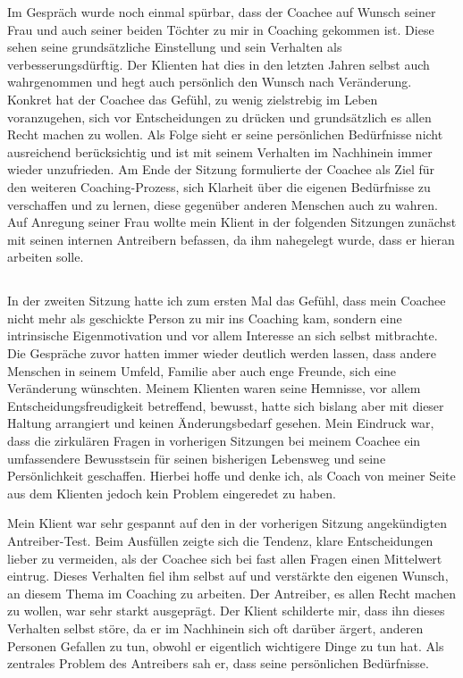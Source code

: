 \documentclass[11pt,a4paper]{article}
\begin{document}
Im Gespräch wurde noch einmal spürbar, dass der Coachee auf Wunsch seiner Frau und auch seiner beiden Töchter zu mir in Coaching gekommen ist. Diese sehen seine grundsätzliche Einstellung und sein Verhalten als verbesserungsdürftig. Der Klienten hat dies in den letzten Jahren selbst auch wahrgenommen und hegt auch persönlich den Wunsch nach Veränderung. Konkret hat der Coachee das Gefühl, zu wenig zielstrebig im Leben voranzugehen, sich vor Entscheidungen zu drücken und grundsätzlich es allen Recht machen zu wollen. Als Folge sieht er seine persönlichen Bedürfnisse nicht ausreichend berücksichtig und ist mit seinem Verhalten im Nachhinein immer wieder unzufrieden. Am Ende der Sitzung formulierte der Coachee als Ziel für den weiteren Coaching-Prozess, sich Klarheit über die eigenen Bedürfnisse zu verschaffen und zu lernen, diese gegenüber anderen Menschen auch zu wahren. Auf Anregung seiner Frau wollte mein Klient in der folgenden Sitzungen zunächst mit seinen internen Antreibern befassen, da ihm nahegelegt wurde, dass er hieran arbeiten solle.



\subsection*{\color{Orange}{Zweite Sitzung: Antreiber-Modell}}

In der zweiten Sitzung hatte ich zum ersten Mal das Gefühl, dass mein Coachee nicht mehr als geschickte Person zu mir ins Coaching kam, sondern eine intrinsische Eigenmotivation und vor allem Interesse an sich selbst mitbrachte. Die Gespräche zuvor hatten immer wieder deutlich werden lassen, dass andere Menschen in seinem Umfeld, Familie aber auch enge Freunde, sich eine Veränderung wünschten. Meinem Klienten waren seine Hemnisse, vor allem Entscheidungsfreudigkeit betreffend, bewusst, hatte sich bislang aber mit dieser Haltung arrangiert und keinen Änderungsbedarf gesehen. Mein Eindruck war, dass die zirkulären Fragen in vorherigen Sitzungen bei meinem Coachee ein umfassendere Bewusstsein für seinen bisherigen Lebensweg und seine Persönlichkeit geschaffen. Hierbei hoffe und denke ich, als Coach von meiner Seite aus dem Klienten jedoch kein Problem eingeredet zu haben. 

Mein Klient war sehr gespannt auf den in der vorherigen Sitzung angekündigten Antreiber-Test. Beim Ausfüllen zeigte sich die Tendenz, klare Entscheidungen lieber zu vermeiden, als der Coachee sich bei fast allen Fragen einen Mittelwert eintrug. Dieses Verhalten fiel ihm selbst auf und verstärkte den eigenen Wunsch, an diesem Thema im Coaching zu arbeiten. Der Antreiber, es allen Recht machen zu wollen, war sehr starkt ausgeprägt. Der Klient schilderte mir, dass ihn dieses Verhalten selbst störe, da er im Nachhinein sich oft darüber ärgert, anderen Personen Gefallen zu tun, obwohl er eigentlich wichtigere Dinge zu tun hat. Als zentrales Problem des Antreibers sah er, dass seine persönlichen Bedürfnisse.
\end{document}
